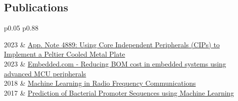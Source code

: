 \documentclass[
	10pt, %
]{FreemanCV}
\begin{document}
\begin{paracol}{2}
	
	
	




\section{Publications}


\begin{supertabular}{p{0.05\linewidth} p{0.88\linewidth}} %
	
	2023 & \href{
	https://ww1.microchip.com/downloads/aemDocuments/documents/MCU08/ApplicationNotes/ApplicationNotes/AN4889-Using-CIPs-To-Implement-Peltier-Plate-DS00004889.pdf
	}{
	App. Note 4889: Using Core Independent Peripherals (CIPs) to Implement a Peltier Cooled Metal Plate
	\scriptsize\faLink} \\[5pt]
	2023 & \href{
	https://www.embedded.com/reducing-bom-cost-in-embedded-systems-using-advanced-mcu-peripherals/
	}{
	Embedded.com - Reducing BOM cost in embedded systems using advanced MCU peripherals
	\scriptsize\faLink} \\[5pt]
	2018 & \href{
	http://joshbooth.us/wp-content/uploads/2023/08/Machine-Learning-in-Radio-Frequency-Communications.pdf
	}{
	Machine Learning in Radio Frequency Communications
	\scriptsize\faLink} \\[5pt]
	2017 & \href{
	http://joshbooth.us/wp-content/uploads/2023/08/poster_SBME_promoter_predictions.pdf
	}{
	Prediction of Bacterial Promoter Sequences using Machine Learning
	\scriptsize\faLink} \\[5pt]
	

\end{supertabular}
\end{paracol}
\end{document}
